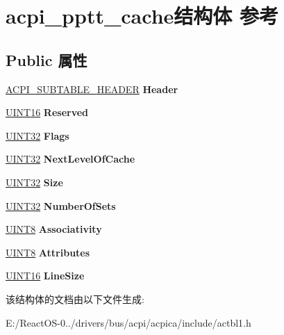 \hypertarget{structacpi__pptt__cache}{}\section{acpi\+\_\+pptt\+\_\+cache结构体 参考}
\label{structacpi__pptt__cache}
\subsection*{Public 属性}
\begin{DoxyCompactItemize}
\item 
\mbox{\label{structacpi__pptt__cache_ae2496cc883ed33edf6845998b8271fab}} 
\hyperlink{structacpi__subtable__header}{A\+C\+P\+I\+\_\+\+S\+U\+B\+T\+A\+B\+L\+E\+\_\+\+H\+E\+A\+D\+ER} {\bfseries Header}
\item 
\mbox{\label{structacpi__pptt__cache_a952a5c2006412429eaeccafb8bbb573d}} 
\hyperlink{_processor_bind_8h_a09f1a1fb2293e33483cc8d44aefb1eb1}{U\+I\+N\+T16} {\bfseries Reserved}
\item 
\mbox{\label{structacpi__pptt__cache_a40c4dab0cfafff87f01e3d1c469ca7a5}} 
\hyperlink{_processor_bind_8h_ae1e6edbbc26d6fbc71a90190d0266018}{U\+I\+N\+T32} {\bfseries Flags}
\item 
\mbox{\label{structacpi__pptt__cache_a1ebaefddc063338e3bfd8ce35f2a249b}} 
\hyperlink{_processor_bind_8h_ae1e6edbbc26d6fbc71a90190d0266018}{U\+I\+N\+T32} {\bfseries Next\+Level\+Of\+Cache}
\item 
\mbox{\label{structacpi__pptt__cache_a4df4762e9a66f4a821c0ac9e69d7cf00}} 
\hyperlink{_processor_bind_8h_ae1e6edbbc26d6fbc71a90190d0266018}{U\+I\+N\+T32} {\bfseries Size}
\item 
\mbox{\label{structacpi__pptt__cache_aadd3238d226aaa22017927410133566b}} 
\hyperlink{_processor_bind_8h_ae1e6edbbc26d6fbc71a90190d0266018}{U\+I\+N\+T32} {\bfseries Number\+Of\+Sets}
\item 
\mbox{\label{structacpi__pptt__cache_aa5992955b4782f7c2fa546bbd8e12fba}} 
\hyperlink{_processor_bind_8h_ab27e9918b538ce9d8ca692479b375b6a}{U\+I\+N\+T8} {\bfseries Associativity}
\item 
\mbox{\label{structacpi__pptt__cache_a6fb773bacc39c1e5c4deb5af782c332b}} 
\hyperlink{_processor_bind_8h_ab27e9918b538ce9d8ca692479b375b6a}{U\+I\+N\+T8} {\bfseries Attributes}
\item 
\mbox{\label{structacpi__pptt__cache_a2a97e79bbf496d397202c48be2834572}} 
\hyperlink{_processor_bind_8h_a09f1a1fb2293e33483cc8d44aefb1eb1}{U\+I\+N\+T16} {\bfseries Line\+Size}
\end{DoxyCompactItemize}


该结构体的文档由以下文件生成\+:\begin{DoxyCompactItemize}
\item 
E\+:/\+React\+O\+S-\/0../drivers/bus/acpi/acpica/include/actbl1.\+h\end{DoxyCompactItemize}
